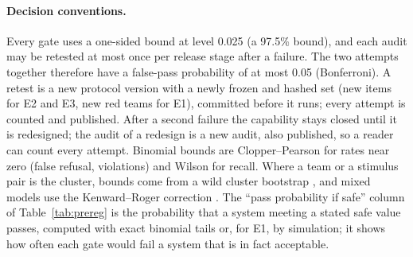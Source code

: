\documentclass[11pt]{article}
\begin{document}
\paragraph{Decision conventions.} Every gate uses a one-sided bound at level 0.025 (a 97.5\% bound), and each audit may be retested at most once per release stage after a failure. The two attempts together therefore have a false-pass probability of at most 0.05 (Bonferroni). A retest is a new protocol version with a newly frozen and hashed set (new items for E2 and E3, new red teams for E1), committed before it runs; every attempt is counted and published. After a second failure the capability stays closed until it is redesigned; the audit of a redesign is a new audit, also published, so a reader can count every attempt. Binomial bounds are Clopper--Pearson for rates near zero (false refusal, violations) and Wilson for recall. Where a team or a stimulus pair is the cluster, bounds come from a wild cluster bootstrap \citep{cameron2008bootstrap}, and mixed models use the Kenward--Roger correction \citep{kenward1997small}. The ``pass probability if safe'' column of Table~\ref{tab:prereg} is the probability that a system meeting a stated safe value passes, computed with exact binomial tails or, for E1, by simulation; it shows how often each gate would fail a system that is in fact acceptable.
\end{document}
